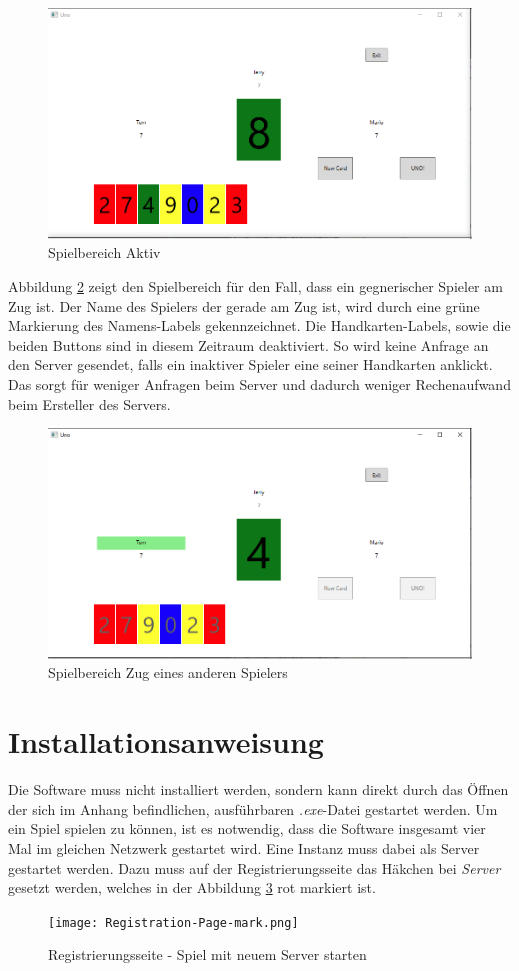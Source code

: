 \begin{figure}[h]
	\begin{center}
		\includegraphics[width=0.6\linewidth]{bilder/Game-Page active.png}
		\caption{Spielbereich Aktiv}
		\label{fig:gameactive}
	\end{center}
\end{figure}
Abbildung \ref{fig:gamedeactive} zeigt den Spielbereich für den Fall, dass ein gegnerischer Spieler am Zug ist. Der Name des Spielers der gerade am Zug ist, wird durch eine grüne Markierung des Namens-Labels gekennzeichnet. Die Handkarten-Labels, sowie die beiden Buttons sind in diesem Zeitraum deaktiviert. So wird keine Anfrage an den Server gesendet, falls ein inaktiver Spieler eine seiner Handkarten anklickt. Das sorgt für weniger Anfragen beim Server und dadurch weniger Rechenaufwand beim Ersteller des Servers. 
\begin{figure}[h]
	\begin{center}
		\includegraphics[width=0.6\linewidth]{bilder/Game-Page.png}
		\caption{Spielbereich Zug eines anderen Spielers}
		\label{fig:gamedeactive}
	\end{center}
\end{figure}


\section{Installationsanweisung}
Die Software muss nicht installiert werden, sondern kann direkt durch das Öffnen der sich im Anhang befindlichen, ausführbaren \textit{.exe}-Datei gestartet werden. Um ein Spiel spielen zu können, ist es notwendig, dass die Software insgesamt vier Mal im gleichen Netzwerk gestartet wird. Eine Instanz muss dabei als Server gestartet werden. Dazu muss auf der Registrierungsseite das Häkchen bei \textit{Server} gesetzt werden, welches in der Abbildung \ref{fig:regipage-mark} rot markiert ist.
\begin{figure}[h]
	\begin{center}
		\texttt{[image: Registration-Page-mark.png]}
		\caption{Registrierungsseite - Spiel mit neuem Server starten}
		\label{fig:regipage-mark}
	\end{center}
\end{figure}

